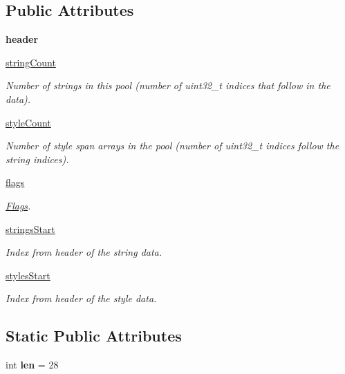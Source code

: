\subsection*{Public Attributes}
\begin{DoxyCompactItemize}
\item 
\mbox{\label{classstringpool_1_1ResStringPool__header_a7985c69ffd49a54a9d9d19997d2cdb2d}} 
{\bfseries header}
\item 
\mbox{\hyperlink{classstringpool_1_1ResStringPool__header_ae6af60c9dce1d1f9aac441e56252f1e8}{string\+Count}}
\begin{DoxyCompactList}\small\item\em Number of strings in this pool (number of uint32\+\_\+t indices that follow in the data). \end{DoxyCompactList}\item 
\mbox{\hyperlink{classstringpool_1_1ResStringPool__header_aebdb909df469bc34c3dbfa47cbe2797f}{style\+Count}}
\begin{DoxyCompactList}\small\item\em Number of style span arrays in the pool (number of uint32\+\_\+t indices follow the string indices). \end{DoxyCompactList}\item 
\mbox{\hyperlink{classstringpool_1_1ResStringPool__header_a03c15e4b87b3e8d019ad6f91ac232d2e}{flags}}
\begin{DoxyCompactList}\small\item\em \mbox{\hyperlink{classstringpool_1_1ResStringPool__header_1_1Flags}{Flags}}. \end{DoxyCompactList}\item 
\mbox{\hyperlink{classstringpool_1_1ResStringPool__header_ae692079b25bbe4f8c3567d7fd9939b61}{strings\+Start}}
\begin{DoxyCompactList}\small\item\em Index from header of the string data. \end{DoxyCompactList}\item 
\mbox{\hyperlink{classstringpool_1_1ResStringPool__header_a1dfb17978a7354dc36b71393611ae610}{styles\+Start}}
\begin{DoxyCompactList}\small\item\em Index from header of the style data. \end{DoxyCompactList}\end{DoxyCompactItemize}
\subsection*{Static Public Attributes}
\begin{DoxyCompactItemize}
\item 
\mbox{\label{classstringpool_1_1ResStringPool__header_ac8ac5aab8a3fb9125463f57896f9a2a1}} 
int {\bfseries len} = 28
\end{DoxyCompactItemize}


